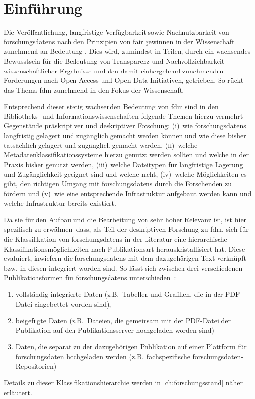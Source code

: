 \chapter{Einführung}\label{ch:einfuehrung}

Die Veröffentlichung, langfristige Verfügbarkeit sowie Nachnutzbarkeit von \glspl{forschungsdaten} nach den Prinzipien von \gls{fair} gewinnen in der Wissenschaft zunehmend an Bedeutung .
Dies wird, zumindest in Teilen, durch ein wachsendes Bewusstsein für die Bedeutung von Transparenz und Nachvollziehbarkeit wissenschaftlicher Ergebnisse und den damit einhergehend zunehmenden Forderungen nach Open Access und Open Data Initiativen, getrieben.
So rückt das Thema \gls{fdm} zunehmend in den Fokus der Wissenschaft.

Entsprechend dieser stetig wachsenden Bedeutung von \gls{fdm} sind in den Bibliotheks- und Informationswissenschaften folgende Themen hierzu vermehrt Gegenstände präskriptiver und deskriptiver Forschung:
(i)~wie \glspl{forschungsdaten} langfristig gelagert und zugänglich gemacht werden können und wie diese bisher tatsächlich gelagert und zugänglich gemacht werden,
(ii)~welche Metadatenklassifikationssysteme hierzu genutzt werden sollten und welche in der Praxis bisher genutzt werden,
(iii)~welche Dateitypen für langfristige Lagerung und Zugänglichkeit geeignet sind und welche nicht,
(iv)~welche Möglichkeiten es gibt, den richtigen Umgang mit \glspl{forschungsdaten} durch die Forschenden zu fördern und
(v)~wie eine entsprechende Infrastruktur aufgebaut werden kann und welche Infrastruktur bereits existiert.

Da sie für den Aufbau und die Bearbeitung von sehr hoher Relevanz ist, ist hier spezifisch zu erwähnen, dass, als Teil der deskriptiven Forschung zu \gls{fdm}, sich für die Klassifikation von \glspl{forschungsdaten} in der Literatur eine hierarchische Klassifikationsmöglichkeiten nach Publikationsart herauskristallisiert hat.
Diese evaluiert, inwiefern die \glspl{forschungsdaten} mit dem dazugehörigen Text verknüpft bzw. in diesen integriert worden sind.
So lässt sich zwischen drei verschiedenen Publikationsformen für \glspl{forschungsdaten} unterschieden~\autocites[S.~36ff.]{ReillyEtAl2011}:
\begin{enumerate}
    \item vollständig integrierte Daten (z.B.~Tabellen und Grafiken, die in der PDF-Datei eingebettet worden sind),
    \item beigefügte Daten (z.B.~Dateien, die gemeinsam mit der PDF-Datei der Publikation auf den Publikationsserver hochgeladen worden sind)
    \item Daten, die separat zu der dazugehörigen Publikation auf einer Plattform für \gls{forschungsdaten} hochgeladen werden (z.B.~fachspezifische \gls{forschungsdaten}-Repositorien)
\end{enumerate}
Details zu dieser Klassifikationshierarchie werden in \cref{ch:forschungsstand} näher erläutert.


